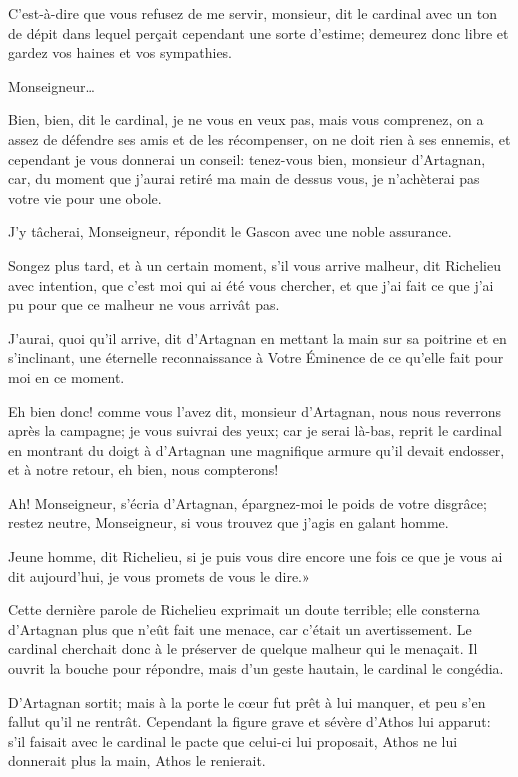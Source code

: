 \speak  C'est-à-dire que vous refusez de me servir, monsieur, dit le cardinal avec un ton de dépit dans lequel perçait cependant une sorte d'estime; demeurez donc libre et gardez vos haines et vos sympathies. 

\speak  Monseigneur\dots 

\speak  Bien, bien, dit le cardinal, je ne vous en veux pas, mais vous comprenez, on a assez de défendre ses amis et de les récompenser, on ne doit rien à ses ennemis, et cependant je vous donnerai un conseil: tenez-vous bien, monsieur d'Artagnan, car, du moment que j'aurai retiré ma main de dessus vous, je n'achèterai pas votre vie pour une obole. 

\speak  J'y tâcherai, Monseigneur, répondit le Gascon avec une noble assurance. 

\speak  Songez plus tard, et à un certain moment, s'il vous arrive malheur, dit Richelieu avec intention, que c'est moi qui ai été vous chercher, et que j'ai fait ce que j'ai pu pour que ce malheur ne vous arrivât pas. 

\speak  J'aurai, quoi qu'il arrive, dit d'Artagnan en mettant la main sur sa poitrine et en s'inclinant, une éternelle reconnaissance à Votre Éminence de ce qu'elle fait pour moi en ce moment. 

\speak  Eh bien donc! comme vous l'avez dit, monsieur d'Artagnan, nous nous reverrons après la campagne; je vous suivrai des yeux; car je serai là-bas, reprit le cardinal en montrant du doigt à d'Artagnan une magnifique armure qu'il devait endosser, et à notre retour, eh bien, nous compterons! 

\speak  Ah! Monseigneur, s'écria d'Artagnan, épargnez-moi le poids de votre disgrâce; restez neutre, Monseigneur, si vous trouvez que j'agis en galant homme. 

\speak  Jeune homme, dit Richelieu, si je puis vous dire encore une fois ce que je vous ai dit aujourd'hui, je vous promets de vous le dire.» 

Cette dernière parole de Richelieu exprimait un doute terrible; elle consterna d'Artagnan plus que n'eût fait une menace, car c'était un avertissement. Le cardinal cherchait donc à le préserver de quelque malheur qui le menaçait. Il ouvrit la bouche pour répondre, mais d'un geste hautain, le cardinal le congédia. 

D'Artagnan sortit; mais à la porte le cœur fut prêt à lui manquer, et peu s'en fallut qu'il ne rentrât. Cependant la figure grave et sévère d'Athos lui apparut: s'il faisait avec le cardinal le pacte que celui-ci lui proposait, Athos ne lui donnerait plus la main, Athos le renierait. 

